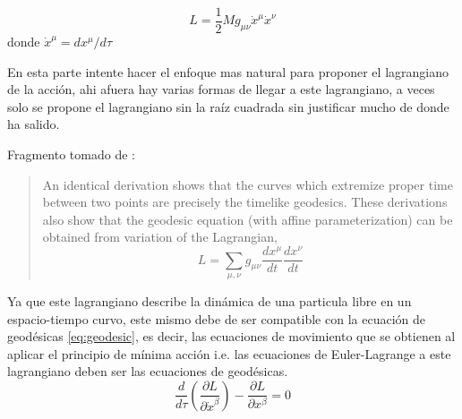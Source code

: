 \begin{equation}
    L = \frac{1}{2} M g_{\mu \nu} \dot{x}^\mu \dot{x}^\nu
\end{equation}
donde $\dot{x}^\mu = dx^\mu / d\tau$
\begin{note}
    En esta parte intente hacer el enfoque mas natural para proponer el lagrangiano de la acción, ahi afuera hay varias formas de llegar a este lagrangiano, a veces solo se propone el lagrangiano sin la raíz cuadrada sin justificar mucho de donde ha salido.

    Fragmento tomado de \cite[ver p. 45]{wald-1984}:
    \begin{quote}
        An identical derivation shows that the curves which extremize proper time between two points are precisely the timelike geodesics. These derivations also show that the geodesic equation (with affine parameterization) can be obtained from variation of the Lagrangian,
        $$
            L=\sum_{\mu, \nu} g_{\mu \nu} \frac{d x^\mu}{d t} \frac{d x^\nu}{d t}
        $$
    \end{quote}
\end{note}

Ya que este lagrangiano describe la dinámica de una particula libre en un espacio-tiempo curvo, este mismo debe de ser compatible con la ecuación de geodésicas \ref{eq:geodesic}, es decir, las ecuaciones de movimiento que se obtienen al aplicar el principio de mínima acción i.e. las ecuaciones de Euler-Lagrange a este lagrangiano deben ser las ecuaciones de geodésicas.
\begin{equation}
    \frac{d}{d\tau} \left( \frac{\partial L}{\partial \dot{x}^\beta} \right) - \frac{\partial L}{\partial x^\beta} = 0
\end{equation}


